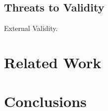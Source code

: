 \documentclass[sigconf,review, anonymous]{acmart}
\begin{document}
\subsection{Threats to Validity}

External Validity. 

\section{Related Work}


\section{Conclusions}






\end{document}
